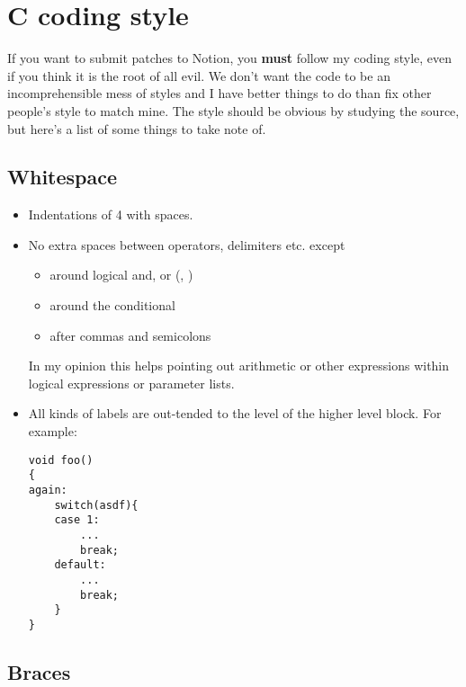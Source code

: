 \section{C coding style}

If you want to submit patches to Notion, you \textbf{must} follow my coding 
style, even if you think it is the root of all evil. We don't want
the code to be an incomprehensible mess of styles and I have better
things to do than fix other people's style to match mine. The style
should be obvious by studying the source, but here's a list of some
things to take note of.

\subsection{Whitespace}

\begin{itemize}
  \item Indentations of 4 with spaces.
    
  \item No extra spaces between operators, delimiters etc. except
    \begin{itemize}
      \item around logical and, or (\code{&&}, \code{||})
      \item around the conditional 
      \item after commas and semicolons
    \end{itemize}  
    In my opinion this helps pointing out arithmetic or other
    expressions within logical expressions or parameter lists.
    
  \item All kinds of labels are out-tended to the level of the higher
    level block. For example:

\begin{verbatim}    
void foo()
{
again:
    switch(asdf){
    case 1:
        ...
        break;
    default:
        ...
        break;
    }
}
\end{verbatim}
\end{itemize}

\subsection{Braces}

